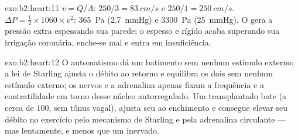 \begin{solution}{exo:b2:heart:11}
$v = Q/A$: $250/3 = \qty{83}{cm/s}$ e $250/1 = \qty{250}{cm/s}$.
$\Delta P = \tfrac12\times 1060\times v^{2}$: \qty{365}{Pa}
(\qty{2.7}{mmHg}) e \qty{3300}{Pa} (\qty{25}{mmHg}). O  gera
a pressão extra espessando sua parede; o  espesso e rígido
acaba superando sua irrigação coronária, enche-se mal e entra em
insuficiência.
\end{solution}

\begin{solution}{exo:b2:heart:12}
O automatismo dá um batimento sem nenhum estímulo externo; a lei de
Starling ajusta o débito ao retorno e equilibra os dois  sem
nenhum estímulo externo; os nervos e a adrenalina apenas fixam a
frequência e a contratilidade em torno desse núcleo autorregulado. Um
 transplantado bate (a cerca de 100, sem tônus vagal), ajusta seu
 ao enchimento e consegue elevar seu débito no
exercício pelo mecanismo de Starling e pela adrenalina circulante ---
mas lentamente, e menos que um  inervado.
\end{solution}

